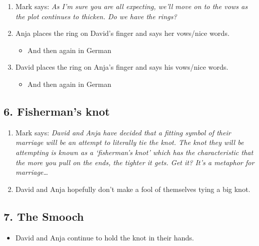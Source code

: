 \begin{enumerate}
\def\labelenumi{\arabic{enumi}.}
\tightlist
\item
  Mark says: \emph{As I'm sure you are all expecting, we'll move on to
  the vows as the plot continues to thicken. Do we have the rings?}
\item
  Anja places the ring on David's finger and says her vows/nice words.

  \begin{itemize}
  \tightlist
  \item
    And then again in German
  \end{itemize}
\item
  David places the ring on Anja's finger and says his vows/nice words.

  \begin{itemize}
  \tightlist
  \item
    And then again in German
  \end{itemize}
\end{enumerate}

\hypertarget{fishermans-knot}{%
\subsection{6. Fisherman's knot}\label{fishermans-knot}}

\begin{enumerate}
\def\labelenumi{\arabic{enumi}.}
\tightlist
\item
  Mark says: \emph{David and Anja have decided that a fitting symbol of
  their marriage will be an attempt to literally tie the knot. The knot
  they will be attempting is known as a `fisherman's knot' which has the
  characteristic that the more you pull on the ends, the tighter it
  gets. Get it? It's a metaphor for marriage\ldots{}}
\item
  David and Anja hopefully don't make a fool of themselves tying a big
  knot.
\end{enumerate}

\hypertarget{the-smooch}{%
\subsection{7. The Smooch}\label{the-smooch}}

\begin{itemize}
\tightlist
\item
  David and Anja continue to hold the knot in their hands.
\end{itemize}


